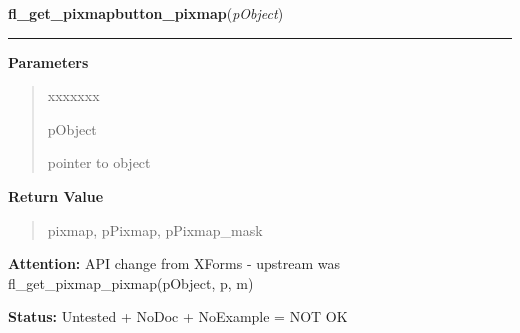     \label{xformslib:library:fl_get_pixmap_pixmap}

    \vspace{0.5ex}

\hspace{.8\funcindent}\begin{boxedminipage}{\funcwidth}

    \raggedright \textbf{fl\_get\_pixmapbutton\_pixmap}(\textit{pObject})

    \vspace{-1.5ex}

    \rule{\textwidth}{0.5\fboxrule}
\setlength{\parskip}{2ex}
\setlength{\parskip}{1ex}
      \textbf{Parameters}
      \vspace{-1ex}

      \begin{quote}
        \begin{Ventry}{xxxxxxx}

          \item[pObject]

          pointer to object

        \end{Ventry}

      \end{quote}

      \textbf{Return Value}
    \vspace{-1ex}

      \begin{quote}
      pixmap, pPixmap, pPixmap\_mask

      \end{quote}

\textbf{Attention:} API change from XForms - upstream was fl\_get\_pixmap\_pixmap(pObject, p, 
m)



\textbf{Status:} Untested + NoDoc + NoExample = NOT OK



    \end{boxedminipage}

    \label{xformslib:library:fl_set_pixmap_align}

    \vspace{0.5ex}

